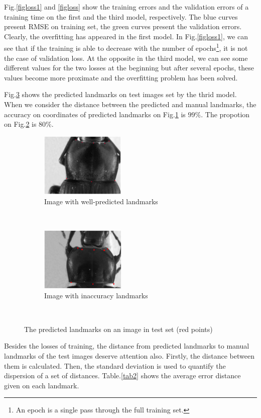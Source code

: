 \documentclass[conference]{IEEEtran}
\begin{document}
Fig.\ref{figloss1} and \ref{figloss} show the training errors and the validation errors of a training time on the first and the third model, respectively. The blue curves present RMSE on training set, the green curves present the validation errors. Clearly, the overfitting has appeared in the first model. In Fig.\ref{figloss1}, we can see that if the training is able to decrease with the number of epochs\footnote{An epoch is a single pass through the full training set.}, it is not the case of validation loss. At the opposite in the third model, we can see some different values for the two losses at the beginning but after several epochs, these values become more proximate and the overfitting problem has been solved.

Fig.\ref{figrsexample} shows the predicted landmarks on test images set by the thrid model. When we consider the distance between the predicted and manual landmarks, the accuracy on coordinates of predicted landmarks on Fig.\ref{figsub1} is $99\%$. The propotion on Fig.\ref{figsub2} is $80\%$.

\begin{figure}[h]
    \centering
    \begin{subfigure}[t]{0.25\textwidth}
        \centering
        \includegraphics[height=1.2in]{images/plandmark.eps}
        \caption{Image with well-predicted landmarks}
        \label{figsub1}
    \end{subfigure}%
    ~ 
    \begin{subfigure}[t]{0.25\textwidth}
        \centering
        \includegraphics[height=1.2in]{images/plandmark2.eps}
        \caption{Image with inaccuracy landmarks}
        \label{figsub2}
    \end{subfigure}
    \caption{The predicted landmarks on an image in test set (red points)}\
    \label{figrsexample}
\end{figure}
Besides the losses of training, the distance from predicted landmarks to manual landmarks of the test images deserve attention also. Firstly, the distance between them is calculated. Then, the standard deviation \cite{bland1996statistics} is used to quantify the dispersion of a set of distances. Table.\ref{tab2} shows the average error distance given on each landmark.
\end{document}

